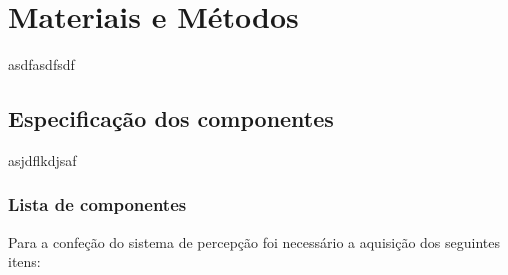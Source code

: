 \chapter{Materiais e Métodos}
\label{chap:mat}
asdfasdfsdf

\section{Especificação dos componentes}
\label{sec:espc}
asjdflkdjsaf


\subsection{Lista de componentes}

\label{ssec:list}

Para a confeção do sistema de percepção foi necessário a aquisição dos seguintes itens:

